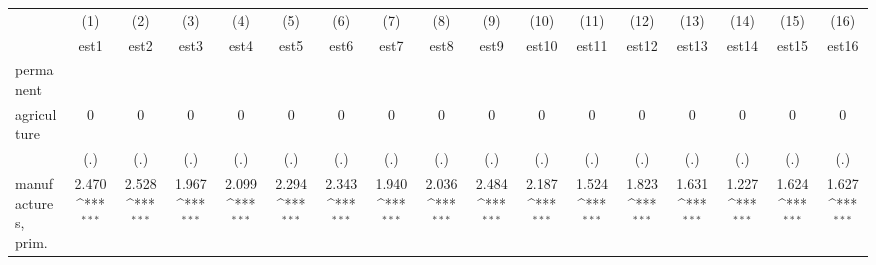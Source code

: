 {
\def\sym#1{\ifmmode^{#1}\else\(^{#1}\)\fi}
\begin{tabular}{l*{16}{c}}
\hline\hline
                    &\multicolumn{1}{c}{(1)}&\multicolumn{1}{c}{(2)}&\multicolumn{1}{c}{(3)}&\multicolumn{1}{c}{(4)}&\multicolumn{1}{c}{(5)}&\multicolumn{1}{c}{(6)}&\multicolumn{1}{c}{(7)}&\multicolumn{1}{c}{(8)}&\multicolumn{1}{c}{(9)}&\multicolumn{1}{c}{(10)}&\multicolumn{1}{c}{(11)}&\multicolumn{1}{c}{(12)}&\multicolumn{1}{c}{(13)}&\multicolumn{1}{c}{(14)}&\multicolumn{1}{c}{(15)}&\multicolumn{1}{c}{(16)}\\
                    &\multicolumn{1}{c}{est1}&\multicolumn{1}{c}{est2}&\multicolumn{1}{c}{est3}&\multicolumn{1}{c}{est4}&\multicolumn{1}{c}{est5}&\multicolumn{1}{c}{est6}&\multicolumn{1}{c}{est7}&\multicolumn{1}{c}{est8}&\multicolumn{1}{c}{est9}&\multicolumn{1}{c}{est10}&\multicolumn{1}{c}{est11}&\multicolumn{1}{c}{est12}&\multicolumn{1}{c}{est13}&\multicolumn{1}{c}{est14}&\multicolumn{1}{c}{est15}&\multicolumn{1}{c}{est16}\\
\hline
permanent           &                     &                     &                     &                     &                     &                     &                     &                     &                     &                     &                     &                     &                     &                     &                     &                     \\
agriculture         &           0         &           0         &           0         &           0         &           0         &           0         &           0         &           0         &           0         &           0         &           0         &           0         &           0         &           0         &           0         &           0         \\
                    &         (.)         &         (.)         &         (.)         &         (.)         &         (.)         &         (.)         &         (.)         &         (.)         &         (.)         &         (.)         &         (.)         &         (.)         &         (.)         &         (.)         &         (.)         &         (.)         \\
[1em]
manufactures, prim. &       2.470\sym{***}&       2.528\sym{***}&       1.967\sym{***}&       2.099\sym{***}&       2.294\sym{***}&       2.343\sym{***}&       1.940\sym{***}&       2.036\sym{***}&       2.484\sym{***}&       2.187\sym{***}&       1.524\sym{***}&       1.823\sym{***}&       1.631\sym{***}&       1.227\sym{***}&       1.624\sym{***}&       1.627\sym{***}\\

\end{tabular}}
